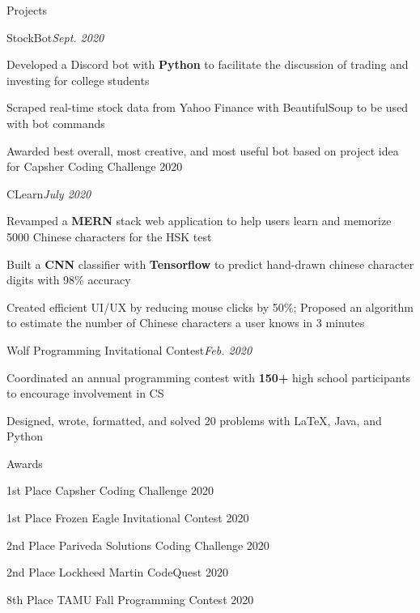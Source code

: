 \documentclass{resume} %
\begin{document}

\begin{rSection}{Projects}

\begin{rSubsection}{StockBot}{\normalfont \textit{Sept. 2020}}{}{}
    \item Developed a Discord bot with \textbf{Python} to facilitate the discussion of trading and investing for college students
    \item Scraped real-time stock data from Yahoo Finance with BeautifulSoup to be used with bot commands
    \item Awarded best overall, most creative, and most useful bot based on project idea for Capsher Coding Challenge 2020
\end{rSubsection}

\begin{rSubsection}{CLearn}{\normalfont \textit{July 2020}}{}{}
    \item Revamped a \textbf{MERN} stack web application to help users learn and memorize 5000 Chinese characters for the HSK test
    \item Built a \textbf{CNN} classifier with \textbf{Tensorflow} to predict hand-drawn chinese character digits with 98\% accuracy
    \item Created efficient UI/UX by reducing mouse clicks by 50\%; Proposed an algorithm to estimate the number of Chinese characters a user knows in 3 minutes
\end{rSubsection}

\begin{rSubsection}{Wolf Programming Invitational Contest}{\normalfont \textit{Feb. 2020}}{}{}
    \item Coordinated an annual programming contest with \textbf{150+} high school participants to encourage involvement in CS 
    \item Designed, wrote, formatted, and solved 20 problems with LaTeX, Java, and Python
\end{rSubsection}
\end{rSection}



\begin{rSection}{Awards}
\begin{rSubsection}{}{}{}{}
    \item 1st Place Capsher Coding Challenge 2020
    \item 1st Place Frozen Eagle Invitational Contest 2020
    \item 2nd Place Pariveda Solutions Coding Challenge 2020
    \item 2nd Place Lockheed Martin CodeQuest 2020
    \item 8th Place TAMU Fall Programming Contest 2020
\end{rSubsection}
\end{rSection}
\end{document}
